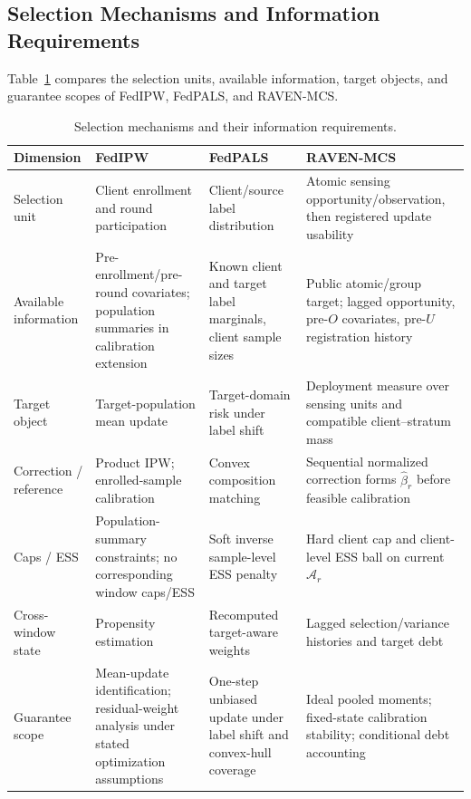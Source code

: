 \begin{table}[t]
\begin{minipage}{\textwidth}
\normalsize
\subsection{Selection Mechanisms and Information Requirements}
Table~\ref{tab:nearest_neighbor} compares the selection units, available
information, target objects, and guarantee scopes of FedIPW, FedPALS,
and RAVEN-MCS.
\end{minipage}
\smallskip

\centering
\caption{Selection mechanisms and their information requirements.}
\label{tab:nearest_neighbor}
\footnotesize
\setlength{\tabcolsep}{3pt}
\begin{tabular}{@{}p{1.8cm}p{4.2cm}p{4.2cm}p{6.0cm}@{}}
\toprule
Dimension & FedIPW~\cite{morishita2026who} & FedPALS~\cite{listozec2024overcoming} & RAVEN-MCS\\
\midrule
Selection unit & Client enrollment and round participation & Client/source label distribution & Atomic sensing opportunity/observation, then registered update usability\\
Available information & Pre-enrollment/pre-round covariates; population summaries in calibration extension & Known client and target label marginals, client sample sizes & Public atomic/group target; lagged opportunity, pre-$O$ covariates, pre-$U$ registration history\\
Target object & Target-population mean update & Target-domain risk under label shift & Deployment measure over sensing units and compatible client--stratum mass\\
Correction / reference & Product IPW; enrolled-sample calibration & Convex composition matching & Sequential normalized correction forms $\widehat\beta_r$ before feasible calibration\\
Caps / ESS & Population-summary constraints; no corresponding window caps/ESS & Soft inverse sample-level ESS penalty & Hard client cap and client-level ESS ball on current $\mathcal A_r$\\
Cross-window state & Propensity estimation & Recomputed target-aware weights & Lagged selection/variance histories and target debt\\
Guarantee scope & Mean-update identification; residual-weight analysis under stated optimization assumptions & One-step unbiased update under label shift and convex-hull coverage & Ideal pooled moments; fixed-state calibration stability; conditional debt accounting\\
\bottomrule
\end{tabular}
\end{table}
\FloatBarrier

